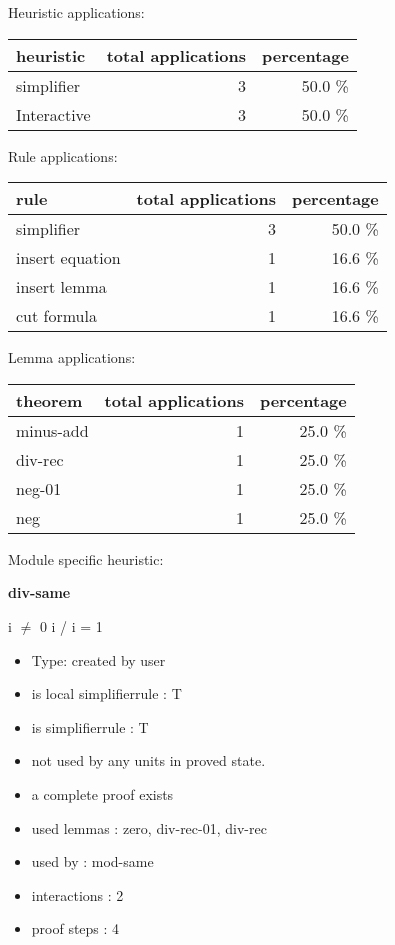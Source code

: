 \documentclass[a4paper]{article}
\begin{document}
\medskip


Heuristic applications:

\begin{supertabular}{l|r|r}
heuristic	& total applications & percentage \\ \hline
simplifier & 3 & 50.0 \% \\
Interactive & 3 & 50.0 \% \\

\end{supertabular}

Rule applications:

\begin{supertabular}{l|r|r}
rule	        & total applications & percentage \\ \hline
simplifier & 3 & 50.0 \% \\
insert equation & 1 & 16.6 \% \\
insert lemma & 1 & 16.6 \% \\
cut formula & 1 & 16.6 \% \\

\end{supertabular}

Lemma applications:

\begin{supertabular}{l|r|r}
theorem	        & total applications & percentage \\ \hline
minus-add & 1 & 25.0 \% \\
div-rec & 1 & 25.0 \% \\
neg-01 & 1 & 25.0 \% \\
neg & 1 & 25.0 \% \\

\end{supertabular}

Module specific heuristic:

\pagebreak

{\LARGE\bf div-same}\label{lemma-div-same}

\medskip

i $\neq$ 0 \Fol i / i = 1

\begin{itemize}

\item Type: created by user

\item is local simplifierrule : T
\item is simplifierrule : T
\item not used by any units in proved state.
\item       a complete proof exists
\item       used lemmas  : zero, div-rec-01, div-rec
\item       used by      : mod-same
\item       interactions : 2
\item       proof steps  : 4
\end{itemize}
\end{document}
